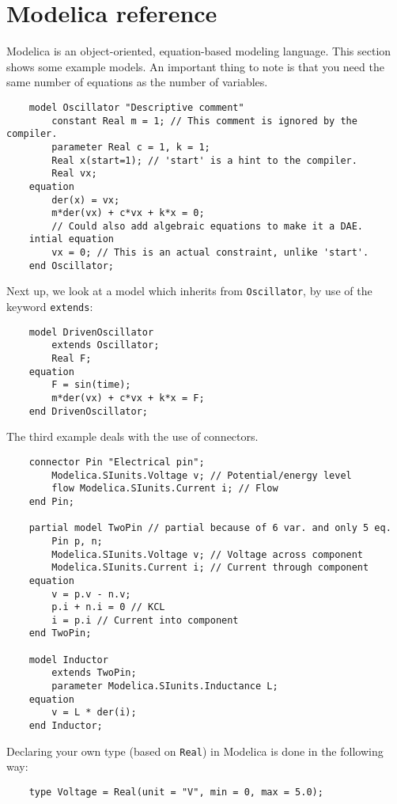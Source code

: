 \part{Modelica reference}
Modelica is an object-oriented, equation-based modeling language. This section shows some example models. An important thing to note is that you need the same number of equations as the number of variables.
\begin{verbatim}
    model Oscillator "Descriptive comment"
        constant Real m = 1; // This comment is ignored by the compiler.
        parameter Real c = 1, k = 1;
        Real x(start=1); // 'start' is a hint to the compiler.
        Real vx;
    equation
        der(x) = vx;
        m*der(vx) + c*vx + k*x = 0;
        // Could also add algebraic equations to make it a DAE.
    intial equation
        vx = 0; // This is an actual constraint, unlike 'start'.
    end Oscillator;
\end{verbatim}
Next up, we look at a model which inherits from \texttt{Oscillator}, by use of the keyword \texttt{extends}:
\begin{verbatim}
    model DrivenOscillator
        extends Oscillator;
        Real F;
    equation
        F = sin(time);
        m*der(vx) + c*vx + k*x = F;
    end DrivenOscillator;
\end{verbatim}
\newpage
The third example deals with the use of connectors.
\begin{verbatim}
    connector Pin "Electrical pin";
        Modelica.SIunits.Voltage v; // Potential/energy level
        flow Modelica.SIunits.Current i; // Flow
    end Pin;

    partial model TwoPin // partial because of 6 var. and only 5 eq.
        Pin p, n;
        Modelica.SIunits.Voltage v; // Voltage across component
        Modelica.SIunits.Current i; // Current through component
    equation
        v = p.v - n.v;
        p.i + n.i = 0 // KCL
        i = p.i // Current into component
    end TwoPin;

    model Inductor
        extends TwoPin;
        parameter Modelica.SIunits.Inductance L;
    equation
        v = L * der(i);
    end Inductor;
\end{verbatim}
Declaring your own type (based on \texttt{Real}) in Modelica is done in the following way:
\begin{verbatim}
    type Voltage = Real(unit = "V", min = 0, max = 5.0);
\end{verbatim}